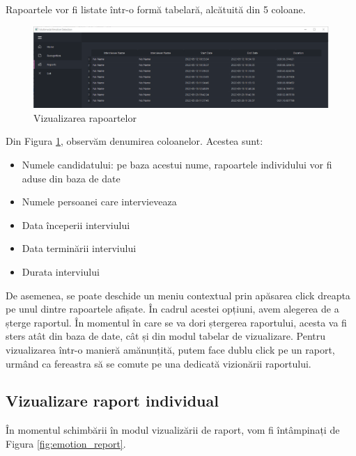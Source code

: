\documentclass[a4paper, 12pt]{report}
\begin{document}
	Rapoartele vor fi listate într-o formă tabelară, alcătuită din 5 coloane.
	
	\begin{figure}[H]
		\begin{center}
			\includegraphics[width=\textwidth,height=\textheight,keepaspectratio]{images/reports.png}
		\end{center}
		\caption{Vizualizarea rapoartelor}
		\label{fig:emotion_reports}
	\end{figure}

	Din Figura \ref{fig:emotion_reports}, observăm denumirea coloanelor. Acestea sunt:
	
	\begin{itemize}
		\item Numele candidatului: pe baza acestui nume, rapoartele individului vor fi aduse din baza de date
		\item Numele persoanei care intervieveaza
		\item Data începerii interviului
		\item Data terminării interviului
		\item Durata interviului
	\end{itemize}
	
	De asemenea, se poate deschide un meniu contextual prin apăsarea click dreapta pe unul dintre rapoartele afișate. În cadrul acestei opțiuni, avem alegerea de a șterge raportul. În momentul în care se va dori ștergerea raportului, acesta va fi sters atât din baza de date, cât și din modul tabelar de vizualizare. Pentru vizualizarea într-o manieră amănunțită, putem face dublu click pe un raport, urmând ca fereastra să se comute pe una dedicată vizionării raportului.
	
	\clearpage
	\subsection{Vizualizare raport individual}
	În momentul schimbării în modul vizualizării de raport, vom fi întâmpinați de Figura \ref{fig:emotion_report}.
	
\end{document}
